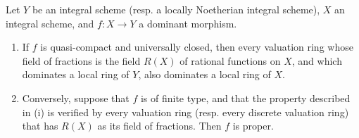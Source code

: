 \begin{corollary}[7.3.10]
\label{II.7.3.10}
Let $Y$ be an integral scheme (resp. a locally Noetherian integral scheme), $X$ an integral scheme, and $f:X\to Y$ a dominant morphism.
\begin{enumerate}
    \item[\rm{(i)}] If $f$ is quasi-compact and universally closed, then every valuation ring whose field of fractions is the field $R(X)$ of rational functions on $X$, and which dominates a local ring of $Y$, also dominates a local ring of $X$.
    \item[\rm{(ii)}] Conversely, suppose that $f$ is of finite type, and that the property described in (i) is verified by every valuation ring (resp. every discrete valuation ring) that has $R(X)$ as its field of fractions.
        Then $f$ is proper.
\end{enumerate}
\end{corollary}

